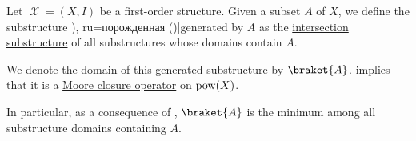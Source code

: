 \begin{definition}\label{def:first_order_generated_substructure}\mimprovised
  Let \( \mscrX = (X, I) \) be a first-order structure. Given a subset \( A \) of \( X \), we define the substructure \term[bg=породена (\cite[110]{ПетровЗяпков2010}), ru=порожденная (\cite[55]{Мальцев1970})]{generated} by \( A \) as the \hyperref[thm:intersection_substructure]{intersection substructure} of all substructures whose domains contain \( A \).

  We denote the domain of this generated substructure by \( \braket{ A } \).  implies that it is a \hyperref[def:moore_closure_operator]{Moore closure operator} on \( \operatorname{pow}(X) \).
\end{definition}
\begin{comments}
  \item In particular, as a consequence of , \( \braket{ A } \) is the minimum among all substructure domains containing \( A \).
\end{comments}


